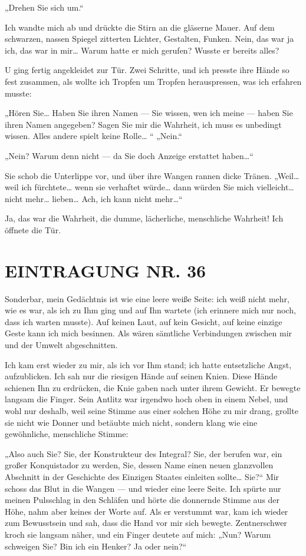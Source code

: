 „Drehen Sie sich um.“

Ich wandte mich ab und drückte die Stirn an die gläserne Mauer. Auf
dem schwarzen, nassen Spiegel zitterten
Lichter, Gestalten, Funken. Nein, das war ja ich, das war in mir\ldots{}
Warum hatte er mich gerufen? Wusste er bereits alles?

U ging fertig angekleidet zur Tür. Zwei Schritte, und ich presste
ihre Hände so fest zusammen, als wollte ich Tropfen um Tropfen
herauspressen, was ich erfahren musste:

„Hören Sie\ldots{} Haben Sie ihren Namen — Sie wissen, wen ich meine —
haben Sie ihren Namen angegeben? Sagen Sie mir die Wahrheit, ich
muss es unbedingt wissen. Alles andere spielt keine Rolle\ldots{} “
„Nein.“

„Nein? Warum denn nicht — da Sie doch Anzeige erstattet haben\ldots{}“

Sie schob die Unterlippe vor, und über ihre Wangen rannen dicke
Tränen. „Weil\ldots{} weil ich fürchtete\ldots{} wenn sie verhaftet würde\ldots{}
dann würden Sie mich vielleicht\ldots{} nicht mehr\ldots{} lieben\ldots{} Ach, ich
kann nicht mehr\ldots{}“

Ja, das war die Wahrheit, die dumme, lächerliche, menschliche
Wahrheit! Ich öffnete die Tür.

\section{EINTRAGUNG NR. 36}

Sonderbar, mein Gedächtnis ist wie eine leere weiße Seite: ich weiß
nicht mehr, wie es war, als ich zu Ihm ging und auf Ihn wartete
(ich erinnere mich nur noch, dass ich warten musste). Auf keinen
Laut, auf kein Gesicht, auf keine einzige Geste kann ich mich
besinnen. Als wären
sämtliche Verbindungen zwischen mir und der Umwelt abgeschnitten.

Ich kam erst wieder zu mir, als ich vor Ihm stand; ich hatte
entsetzliche Angst, aufzublicken. Ich sah nur die riesigen Hände
auf seinen Knien. Diese Hände schienen Ihn zu erdrücken, die Knie
gaben nach unter ihrem Gewicht. Er bewegte langsam die Finger. Sein
Antlitz war irgendwo hoch oben in einem Nebel, und wohl nur
deshalb, weil seine Stimme aus einer solchen Höhe zu mir drang,
grollte sie nicht wie Donner und betäubte mich nicht, sondern klang
wie eine gewöhnliche, menschliche Stimme:

„Also auch Sie? Sie, der Konstrukteur des Integral? Sie, der
berufen war, ein großer Konquistador zu werden, Sie, dessen Name
einen neuen glanzvollen Abschnitt in der Geschichte des Einzigen
Staates einleiten sollte\ldots{} Sie?“ Mir schoss das Blut in die Wangen
— und wieder eine leere Seite. Ich spürte nur meinen Pulsschlag in
den Schläfen und hörte die donnernde Stimme aus der Höhe, nahm aber
keines der Worte auf. Als er verstummt war, kam ich wieder zum
Bewusstsein und sah, dass die Hand vor mir sich bewegte.
Zentnerschwer kroch sie langsam näher, und ein Finger deutete auf
mich: „Nun? Warum schweigen Sie? Bin ich ein Henker? Ja oder
nein?“

